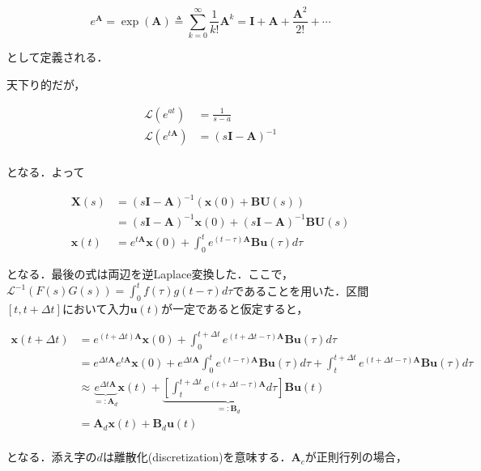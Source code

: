 \begin{equation}
e^\mathbf{A} = \exp(\mathbf{A}) \triangleq \sum_{k=0}^\infty \frac{1}{k!}\mathbf{A}^k = \mathbf{I}+\mathbf{A}+\frac{\mathbf{A}^2}{2!}+\cdots
\end{equation}


として定義される．

天下り的だが，


\begin{align}
\mathcal{L}(e^{at})&=\frac{1}{s-a}\\
\mathcal{L}(e^{t\mathbf{A}})&=(s\mathbf{I} - \mathbf{A})^{-1}\\
\end{align}


となる．よって


\begin{align}
\boldsymbol{X}(s) &= (s\mathbf{I} - \mathbf{A})^{-1}(\mathbf{x}(0) + \mathbf{B}\boldsymbol{U}(s))\\
&= (s\mathbf{I} - \mathbf{A})^{-1}\mathbf{x}(0) + (s\mathbf{I} - \mathbf{A})^{-1}\mathbf{B}\boldsymbol{U}(s)\\
\mathbf{x}(t)&=e^{t\mathbf{A}}\mathbf{x}(0)+\int_0^t e^{(t-\tau)\mathbf{A}}\mathbf{B}\mathbf{u}(\tau) d\tau
\end{align}


となる．最後の式は両辺を逆Laplace変換した．ここで，$\mathcal{L}^{-1}(F(s)G(s))=\int_0^tf(\tau)g(t-\tau)d\tau$であることを用いた．区間$[t, t+\Delta t]$において入力$\mathbf{u}(t)$が一定であると仮定すると，


\begin{align}
\mathbf{x}(t+\Delta t)&=e^{(t+\Delta t)\mathbf{A}}\mathbf{x}(0)+\int_0^{t+\Delta t} e^{(t+\Delta t-\tau)\mathbf{A}}\mathbf{B}\mathbf{u}(\tau) d\tau\\
&=e^{\Delta t\mathbf{A}}e^{t\mathbf{A}}\mathbf{x}(0)+e^{\Delta t\mathbf{A}}\int_0^{t} e^{(t-\tau)\mathbf{A}}\mathbf{B}\mathbf{u}(\tau) d\tau + \int_t^{t+\Delta t} e^{(t+\Delta t-\tau)\mathbf{A}}\mathbf{B}\mathbf{u}(\tau) d\tau\\
&\approx \underbrace{e^{\Delta t\mathbf{A}}}_{=: \mathbf{A}_d}\mathbf{x}(t)+\underbrace{\left[\int_t^{t+\Delta t} e^{(t+\Delta t-\tau)\mathbf{A}} d\tau\right] \mathbf{B}}_{=: \mathbf{B}_d}\mathbf{u}(t)\\
&=\mathbf{A}_d\mathbf{x}(t)+\mathbf{B}_d\mathbf{u}(t)\\
\end{align}


となる．添え字の$d$は離散化(discretization)を意味する．$\mathbf{A}_c$が正則行列の場合，


